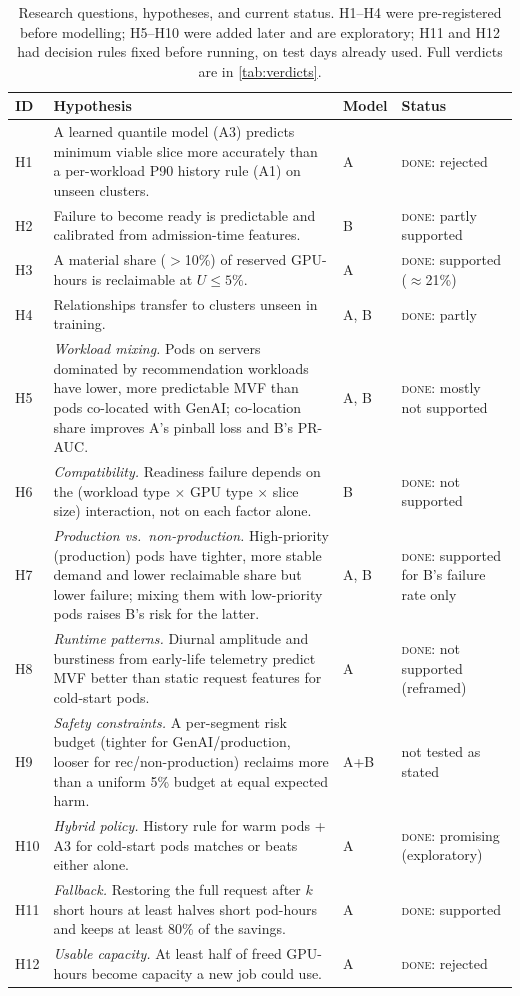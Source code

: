 \documentclass[11pt]{article}
\newcommand{\status}[1]{\textsc{#1}}
\begin{document}
\begin{table}[h]
\centering\small
\caption{Research questions, hypotheses, and current status. H1--H4 were pre-registered before modelling; H5--H10 were added later and are exploratory; H11 and H12 had decision rules fixed before running, on test days already used. Full verdicts are in \cref{tab:verdicts}.}
\label{tab:hyp}
\begin{tabularx}{\linewidth}{@{}p{0.6cm}Lp{2.2cm}p{2.3cm}@{}}
\toprule
ID & Hypothesis & Model & Status \\
\midrule
H1 & A learned quantile model (A3) predicts minimum viable slice more accurately than a per-workload P90 history rule (A1) on unseen clusters. & A & \status{done}: rejected \\
H2 & Failure to become ready is predictable and calibrated from admission-time features. & B & \status{done}: partly supported \\
H3 & A material share ($>$10\%) of reserved GPU-hours is reclaimable at $U \le 5\%$. & A & \status{done}: supported ($\approx$21\%) \\
H4 & Relationships transfer to clusters unseen in training. & A, B & \status{done}: partly \\
\midrule
H5 & \emph{Workload mixing.} Pods on servers dominated by recommendation workloads have lower, more predictable MVF than pods co-located with GenAI; co-location share improves A's pinball loss and B's PR-AUC. & A, B & \status{done}: mostly not supported \\
H6 & \emph{Compatibility.} Readiness failure depends on the (workload type $\times$ GPU type $\times$ slice size) interaction, not on each factor alone. & B & \status{done}: not supported \\
H7 & \emph{Production vs.\ non-production.} High-priority (production) pods have tighter, more stable demand and lower reclaimable share but lower failure; mixing them with low-priority pods raises B's risk for the latter. & A, B & \status{done}: supported for B's failure rate only \\
H8 & \emph{Runtime patterns.} Diurnal amplitude and burstiness from early-life telemetry predict MVF better than static request features for cold-start pods. & A & \status{done}: not supported (reframed) \\
H9 & \emph{Safety constraints.} A per-segment risk budget (tighter for GenAI/production, looser for rec/non-production) reclaims more than a uniform 5\% budget at equal expected harm. & A+B & not tested as stated \\
H10 & \emph{Hybrid policy.} History rule for warm pods + A3 for cold-start pods matches or beats either alone. & A & \status{done}: promising (exploratory) \\
H11 & \emph{Fallback.} Restoring the full request after $k$ short hours at least halves short pod-hours and keeps at least 80\% of the savings. & A & \status{done}: supported \\
H12 & \emph{Usable capacity.} At least half of freed GPU-hours become capacity a new job could use. & A & \status{done}: rejected \\
\bottomrule
\end{tabularx}
\end{table}
\end{document}
